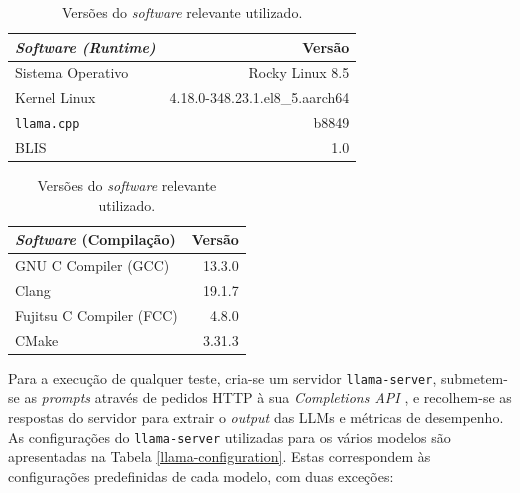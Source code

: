 \documentclass[11pt, a4paper]{article}
\begin{document}
\begin{table}[H]
    \centering
    \begin{minipage}{0.6\textwidth}
        \centering
        \begin{tabular}{|l|r|}
            \hline
            \textbf{\emph{Software (Runtime)}} & \textbf{Versão}                \\ \hline
            Sistema Operativo                  & Rocky Linux 8.5                \\ \hline
            Kernel Linux                       & 4.18.0-348.23.1.el8\_5.aarch64 \\ \hline
            \texttt{llama.cpp}                 & b8849                          \\ \hline
            BLIS                               & 1.0                            \\ \hline
        \end{tabular}
    \end{minipage}%
    \begin{minipage}{0.4\textwidth}
        \centering
        \begin{tabular}{|l|r|}
            \hline
            \textbf{\emph{Software} (Compilação)} & \textbf{Versão} \\ \hline
            GNU C Compiler (GCC)                  & 13.3.0          \\ \hline
            Clang                                 & 19.1.7          \\ \hline
            Fujitsu C Compiler (FCC)              & 4.8.0           \\ \hline
            CMake                                 & 3.31.3          \\ \hline
        \end{tabular}
    \end{minipage}

    \caption{Versões do \emph{software} relevante utilizado.}
    \label{software-versions}
\end{table}

Para a execução de qualquer teste, cria-se um servidor \texttt{llama-server}, submetem-se as
\emph{prompts} através de pedidos HTTP à sua \emph{Completions API} \cite{completions-api}, e
recolhem-se as respostas do servidor para extrair o \emph{output} das LLMs e métricas de desempenho.
As configurações do \texttt{llama-server} utilizadas para os vários modelos são apresentadas na
Tabela \ref{llama-configuration}. Estas correspondem às configurações predefinidas de cada modelo,
com duas exceções:
\end{document}
